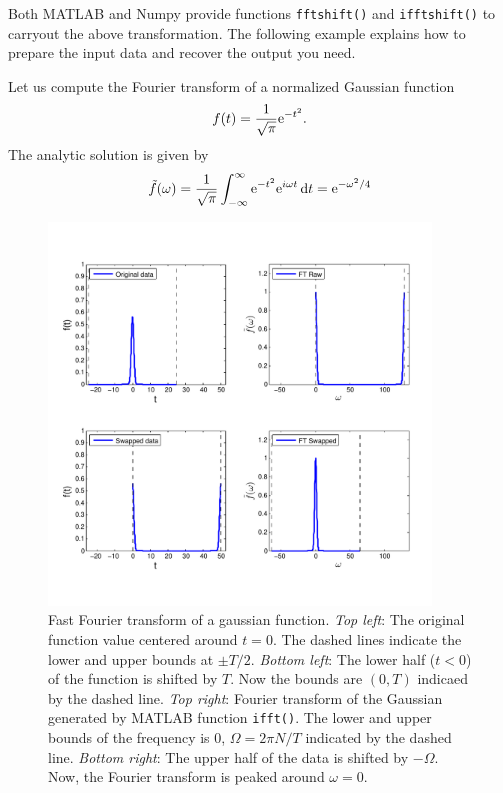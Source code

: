 Both MATLAB and Numpy provide functions \texttt{fftshift()} and \texttt{ifftshift()} to carryout the above transformation.  The following example explains how to prepare the input data and recover the output you need.

\bigskip
\noindent
\begin{example}\label{ex:fft_gaussian}

\medskip
\noindent
Let us compute the Fourier transform of a normalized Gaussian function
\begin{equation}
f(t) = \frac{1}{\sqrt{\pi}} \text{e}^{-t^2}.
\end{equation}
The analytic solution is given by
\begin{equation}
\tilde{f}(\omega) = \frac{1}{\sqrt{\pi}} \int_{-\infty}^\infty \text{e}^{-t^2} \text{e}^{i \omega t} \dd{t}  = \text{e}^{-\omega^2/4}
\end{equation}

\begin{figure}
\centering
\includegraphics[width=4in]{11.fft/fft_gaussian_order.pdf}
\caption{Fast Fourier transform of a gaussian function. \textit{Top left}: The original function value centered around $t=0$.  The dashed lines indicate the lower and upper bounds at $\pm T/2$.  \textit{Bottom left}:  The lower half ($t<0$) of the function is shifted by $T$.  Now the bounds are $(0,T)$ indicaed by the dashed line. \textit{Top right}: Fourier transform of the Gaussian generated by MATLAB function \texttt{ifft()}.  The lower and upper bounds of the frequency is 0, $\Omega=2\pi N/T$ indicated by the dashed line. \textit{Bottom right}:
The upper half of the data is shifted by $-\Omega$.  Now, the Fourier transform is peaked around $\omega=0$.}
\label{fig:fft_gaussian_order}
\end{figure}


\end{example}
